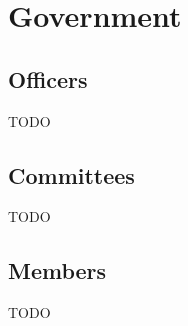\chapter{Government}

\section{Officers}\label{sec:officers}
TODO

\section{Committees}\label{sec:committees}
TODO

\section{Members}\label{sec:members}
TODO
